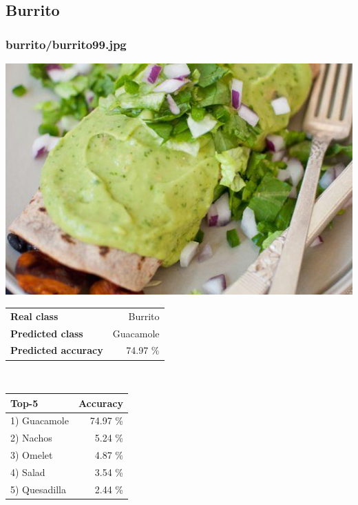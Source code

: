 \subsection{Burrito}
    
\subsubsection{burrito/burrito99.jpg}

\begin{minipage}[t]{0.4\textwidth}
	\vspace{0pt}
	\includegraphics[width=\linewidth]{images/evaluation-images/burrito/burrito99.jpg}
\end{minipage}
\hfill
\begin{minipage}[t]{0.5\textwidth}
	\vspace{0pt}\raggedright
	\begin{tabularx}{\textwidth}{X r}
		\small \textbf{Real class} & \small Burrito\\
		\small \textbf{Predicted class} & \small Guacamole\\
		\small \textbf{Predicted accuracy} & \small 74.97 \%
    \end{tabularx}\\
    
    \vspace{6pt}
	\begin{tabularx}{\textwidth}{X r}
        \small \textbf{Top-5} & \small \textbf{Accuracy} \\
        \hline
		\small 1) Guacamole & \small 74.97 \%\\\small 2) Nachos & \small 5.24 \%\\\small 3) Omelet & \small 4.87 \%\\\small 4) Salad & \small 3.54 \%\\\small 5) Quesadilla & \small 2.44 \%
    \end{tabularx}
\end{minipage}
    
